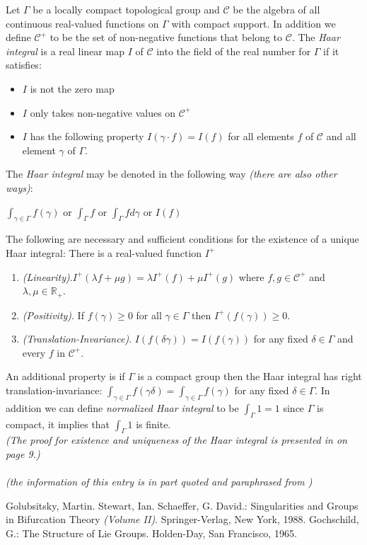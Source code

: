 \documentclass[12pt]{article}
\begin{document}
Let $\Gamma$ be a locally compact topological group and $\mathcal{C}$ be the algebra of all continuous real-valued functions on $\Gamma$ with compact support.  In addition we define $\mathcal{C}^{+}$ to be the set of non-negative functions that belong to $\mathcal{C}$.  The \emph{Haar integral} is a real linear map $I$ of $\mathcal{C}$ into the field of the real number for $\Gamma$ if it satisfies:
\begin{itemize}
\item $I$ is not the zero map
\item $I$ only takes non-negative values on $\mathcal{C}^{+}$
\item $I$ has the following property $I(\gamma\cdot f) = I(f)$ for all elements $f$ of $\mathcal{C}$ and all element $\gamma$ of $\Gamma$.
\end{itemize}
The \emph{Haar integral} may be denoted in the following way \textit{(there are also other ways)}:
\begin{center}
$\int_{\gamma \in \Gamma} f(\gamma)$ or $\int_\Gamma f$ or $\int_\Gamma f d\gamma$ or $I(f)$
\end{center}
The following are necessary and sufficient conditions for the existence of
a unique Haar integral:
There is a real-valued function $I^+$
\begin{enumerate}
\item \textit{(Linearity)}.$I^+ (\lambda f + \mu g) = \lambda I^+(f) + \mu I^+(g)$ where $f,g \in \mathcal{C}^+$ and $\lambda, \mu \in \mathbb{R}_+$. 
\item \textit{(Positivity)}.  If $f(\gamma ) \geq 0$ for all $\gamma \in \Gamma$ then $I^+(f(\gamma)) \geq 0$.
\item \textit{(Translation-Invariance)}.  $I(f(\delta \gamma )) = I(f(\gamma ))$ for any fixed $\delta \in \Gamma$ and every $f$ in $\mathcal{C}^+$.
\end{enumerate}
An additional property is if $\Gamma$ is a compact group then the Haar integral  has right translation-invariance:  $\int_{\gamma \in \Gamma} f(\gamma \delta) = \int_{\gamma \in \Gamma} f(\gamma )$ for any fixed $\delta \in \Gamma$.
In addition we can define \emph{normalized Haar integral} to be $\int_\Gamma 1 = 1$ since $\Gamma$ is compact, it implies that $\int_\Gamma 1$ is finite.\\
\textit{(The proof for existence and uniqueness of the Haar integral is presented in \cite{2} on page 9.)}\\\\
\small\textit{(the information of this entry is in part quoted and paraphrased from \cite{1})}
\begin{thebibliography}{2}
 Golubsitsky, Martin. Stewart, Ian. Schaeffer, G. David.: Singularities and Groups in Bifurcation Theory \textit{(Volume II)}. Springer-Verlag, New York, 1988.
 Gochschild, G.: The Structure of Lie Groups. Holden-Day, San Francisco, 1965.
\end{thebibliography}
\end{document}
